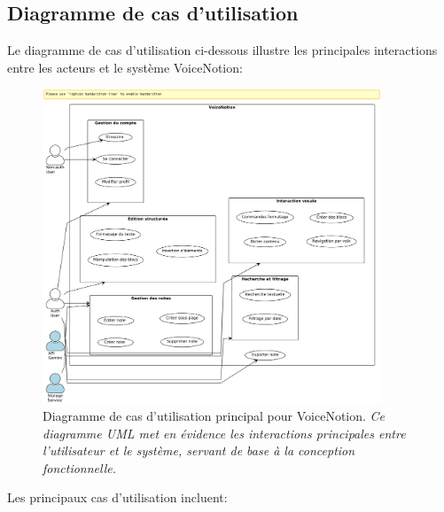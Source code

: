     \subsection{Diagramme de cas d'utilisation}
    
    Le diagramme de cas d'utilisation ci-dessous illustre les principales interactions entre les acteurs et le système VoiceNotion:
    
        \begin{figure}[htbp]
        \centering
        \includegraphics[width=0.9\textwidth]{assets/docs/voicenotion_use_case.png}
        \caption{Diagramme de cas d'utilisation principal pour VoiceNotion. \newline\textit{Ce diagramme UML met en évidence les interactions principales entre l'utilisateur et le système, servant de base à la conception fonctionnelle.}}
        \label{fig:use_case_diagram}
    \end{figure}
    
    Les principaux cas d'utilisation incluent:
    
